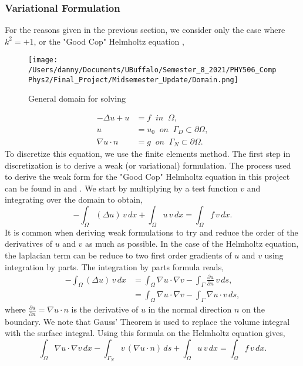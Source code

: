 \documentclass[]{article}
\theoremstyle{definition}
\begin{document}
\subsubsection{Variational Formulation}
For the reasons given in the previous section, we consider only the case where $k^2=+1$, or the "Good Cop" Helmholtz equation \cite{Farrell2018},
\begin{figure}[!ht]
\begin{center}
\texttt{[image: /Users/danny/Documents/UBuffalo/Semester\_8\_2021/PHY506\_CompPhys2/Final\_Project/Midsemester\_Update/Domain.png]}
\end{center}
\caption{General domain for solving}
\label{Domain}
\end{figure}
\begin{align}
-\Delta u + u &= f \;\; in \;\; \Omega, \\
u &= u_0 \;\; on \;\; \Gamma_D \subset \partial \Omega, \\
\nabla u\cdot n &= g \;\; on \;\; \Gamma_N \subset \partial \Omega.
\label{pde}
\end{align}
To discretize this equation, we use the finite elements method.  The first step in discretization is to derive a weak (or variational) formulation.  The process used to derive the weak form for the "Good Cop" Helmholtz equation in this project can be found in \cite{AutomatedFEM2011} and \cite{Fenics2017}.  We start by multiplying by a test function $v$ and integrating over the domain to obtain,
\begin{equation}
-\int_{\Omega} (\Delta u) \, v \, dx + \int_{\Omega} u \, v \, dx = \int_{\Omega} f \, v \, dx.
\end{equation}
It is common when deriving weak formulations to try and reduce the order of the derivatives of $u$ and $v$ as much as possible.  In the case of the Helmholtz equation, the laplacian term can be reduce to two first order gradients of $u$ and $v$ using integration by parts.  The integration by parts formula reads,
\begin{align}
-\int_\Omega (\Delta u) \, v \, dx &= \int_\Omega \nabla u \cdot \nabla v - \int_{\Gamma} \frac{\partial u}{\partial n} \, v \, ds, \\
 &= \int_\Omega \nabla u \cdot \nabla v - \int_{\Gamma} \nabla u \cdot v \, ds,
\end{align}
where $\frac{\partial u}{\partial n} = \nabla u \cdot n$ is the derivative of $u$ in the normal direction $n$ on the boundary.  We note that Gauss' Theorem is used to replace the volume integral with the surface integral.  Using this formula on the Helmholtz equation gives, 
\begin{equation}
\int_{\Omega} \nabla u \cdot \nabla v \, dx - \int_{\Gamma_N} v \, (\nabla u \cdot n) \, ds + \int_{\Omega} u \, v \, dx = \int_{\Omega} f \, v \, dx.
\end{equation}
\end{document}
